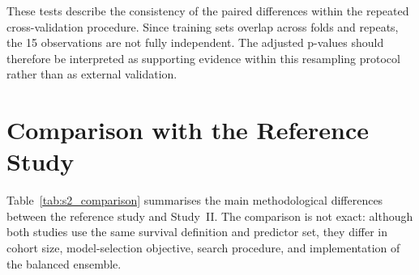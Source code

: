 These tests describe the consistency of the paired differences within the repeated cross-validation procedure. Since training sets overlap across folds and repeats, the 15 observations are not fully independent. The adjusted p-values should therefore be interpreted as supporting evidence within this resampling protocol rather than as external validation.

\section{Comparison with the Reference Study}
\label{sec:s2r_comparison}

Table~\ref{tab:s2_comparison} summarises the main methodological differences between the reference study and Study~II. The comparison is not exact: although both studies use the same survival definition and predictor set, they differ in cohort size, model-selection objective, search procedure, and implementation of the balanced ensemble.

\begin{table}[ht!]
  \centering
  \caption[Comparison with Papaiz et al.\ (2024)]{Methodological comparison between Papaiz et al.~\cite{Papaiz2024} and Study~II. \textsuperscript{a}The reported values correspond to different evaluation stages and are not directly comparable.}
  \label{tab:s2_comparison}
\end{table}

